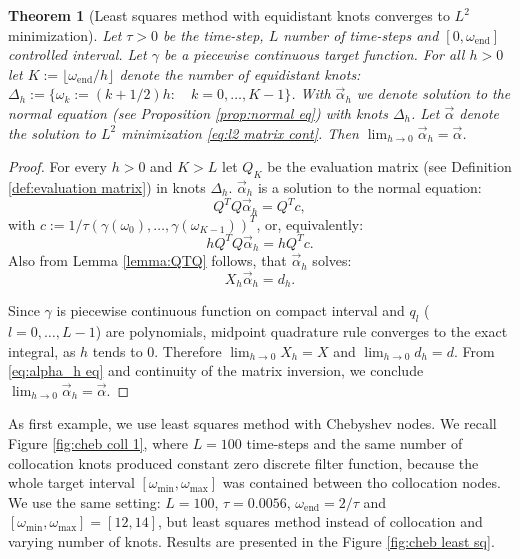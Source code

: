 \documentclass[a4paper,11pt,bibliography=totoc,listof=totoc,headinclude=true,cleardoublepage=empty,oneside]{scrbook}
\newtheorem{theorem}{Theorem}[chapter]
\newcommand{\e}{\mathrm{end}}
\begin{document}
\begin{theorem}[Least squares method with equidistant knots converges to $L^2$ minimization]\label{theorem:lsq converges to l2}
    Let $\tau>0$ be the time-step, $L$ number of time-steps and $[0, \omega_\e]$ controlled interval. Let $\gamma$ be a piecewise continuous target function. For all $h>0$ let $K := \lfloor \omega_\e/h\rfloor $ denote the number of equidistant knots: $ \Delta_h := \{\omega_k := (k+1/2)h : \quad k=0, \dots, K-1\}$. With $\Vec{\alpha}_h$ we denote solution to the normal equation (see Proposition \ref{prop:normal eq}) with knots $\Delta_h$. Let $\Vec{\alpha}$ denote the solution to $L^2$ minimization \eqref{eq:l2 matrix cont}. Then $\lim_{h\rightarrow 0} \Vec{\alpha}_h = \Vec{\alpha}$.

\end{theorem}
\begin{proof}
    For every $h>0$ and $K>L$ let $Q_K$ be the evaluation matrix (see Definition \ref{def:evaluation matrix}) in knots $\Delta_h$. $\Vec{\alpha}_h$ is a solution to the normal equation: 
    \begin{equation*}
        Q^T Q \Vec{\alpha}_h = Q^Tc,
    \end{equation*}
    with $c:= 1/\tau \left(\gamma(\omega_0), \dots, \gamma(\omega_{K-1})\right)^T$, or, equivalently:
    \begin{equation*}
        hQ^T Q \Vec{\alpha}_h = hQ^Tc.
    \end{equation*}
    Also from Lemma \ref{lemma:QTQ} follows, that $\Vec{\alpha}_h$ solves:
    \begin{equation}\label{eq:alpha_h eq}
        X_h \Vec{\alpha}_h = d_h.
    \end{equation}
    
    Since $\gamma$ is piecewise continuous function on compact interval and $q_l$ ($l = 0, \dots, L-1$) are polynomials, midpoint quadrature rule converges to the exact integral, as $h$ tends to 0. Therefore $\lim_{h\rightarrow 0} X_h = X$ and $\lim_{h\rightarrow 0} d_h = d$. From \eqref{eq:alpha_h eq} and continuity of the matrix inversion, we conclude $\lim_{h\rightarrow 0} \Vec{\alpha}_h = \Vec{\alpha}$.
\end{proof}

As first example, we use least squares method with Chebyshev nodes. We recall Figure \ref{fig:cheb coll 1}, where $L=100$ time-steps and the same number of collocation knots produced constant zero discrete filter function, because the whole target interval $\left[\omega_{\min}, \omega_{\max}\right]$ was contained between tho collocation nodes. We use the same setting: $L=100$, $\tau = 0.0056$, $\omega_\e = 2/\tau$ and $\left[\omega_{\min}, \omega_{\max}\right] = [12, 14]$, but least squares method instead of collocation and varying number of knots. Results are presented in the Figure \ref{fig:cheb least sq}. 
\end{document}
